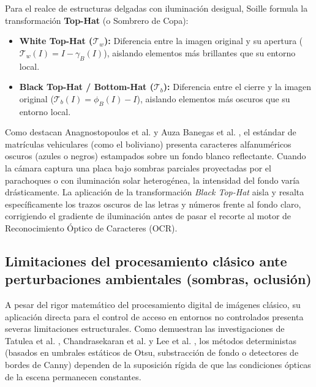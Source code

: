 Para el realce de estructuras delgadas con iluminación desigual, Soille
\cite{soille2003morphological} formula la transformación \textbf{Top-Hat}
(o Sombrero de Copa):
\begin{itemize}
    \item \textbf{White Top-Hat ($\mathcal{T}_w$):} Diferencia entre la imagen
        original y su apertura ($\mathcal{T}_w(I) = I - \gamma_B(I)$), aislando
        elementos más brillantes que su entorno local.

    \item \textbf{Black Top-Hat / Bottom-Hat ($\mathcal{T}_b$):} Diferencia entre
        el cierre y la imagen original ($\mathcal{T}_b(I) = \phi_B(I) - I$),
        aislando elementos más oscuros que su entorno local.
\end{itemize}

Como destacan Anagnostopoulos et al. \cite{anagnostopoulos2008lpr} y Auza Banegas
et al. \cite{auzabanegas2026blpr}, el estándar de matrículas vehiculares (como el
boliviano) presenta caracteres alfanuméricos oscuros (azules o negros) estampados
sobre un fondo blanco reflectante. Cuando la cámara captura una placa bajo
sombras parciales proyectadas por el parachoques o con iluminación solar
heterogénea, la intensidad del fondo varía drásticamente. La aplicación de la
transformación \textit{Black Top-Hat} aisla y resalta específicamente los trazos
oscuros de las letras y números frente al fondo claro, corrigiendo el gradiente
de iluminación antes de pasar el recorte al motor de Reconocimiento Óptico de
Caracteres (OCR).

\subsection{Limitaciones del procesamiento clásico ante perturbaciones 
ambientales (sombras, oclusión)}

A pesar del rigor matemático del procesamiento digital de imágenes clásico, su
aplicación directa para el control de acceso en entornos no controlados presenta
severas limitaciones estructurales. Como demuestran las investigaciones de
Tatulea et al. \cite{tatulea2019image}, Chandrasekaran et al.
\cite{chandrasekaran2022parking} y Lee et al. \cite{lee2023systematic}, los
métodos deterministas (basados en umbrales estáticos de Otsu, substracción de
fondo o detectores de bordes de Canny) dependen de la suposición rígida de que
las condiciones ópticas de la escena permanecen constantes.

